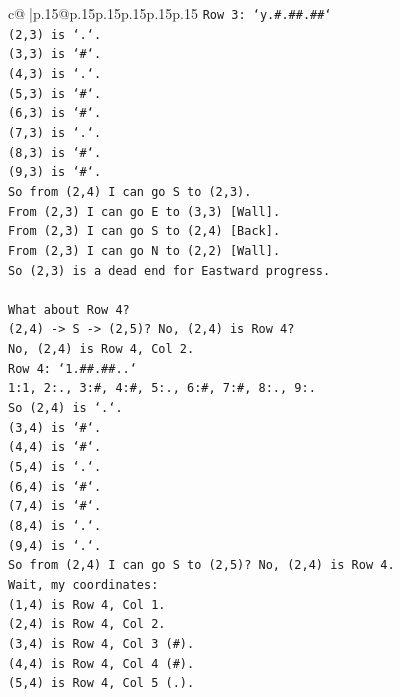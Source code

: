 \documentclass{article}
\begin{document}
{\begin{supertabular}{c@{$\;$}|p{.15\linewidth}@{}p{.15\linewidth}p{.15\linewidth}p{.15\linewidth}p{.15\linewidth}p{.15\linewidth}}
{{{\texttt{Row 3: `y.\#.\#\#.\#\#`} \\
\texttt{(2,3) is `.`.} \\
\texttt{(3,3) is `\#`.} \\
\texttt{(4,3) is `.`.} \\
\texttt{(5,3) is `\#`.} \\
\texttt{(6,3) is `\#`.} \\
\texttt{(7,3) is `.`.} \\
\texttt{(8,3) is `\#`.} \\
\texttt{(9,3) is `\#`.} \\
\texttt{So from (2,4) I can go S to (2,3).} \\
\texttt{From (2,3) I can go E to (3,3) {[}Wall{]}.} \\
\texttt{From (2,3) I can go S to (2,4) {[}Back{]}.} \\
\texttt{From (2,3) I can go N to (2,2) {[}Wall{]}.} \\
\texttt{So (2,3) is a dead end for Eastward progress.} \\
\\ 
\texttt{What about Row 4?} \\
\texttt{(2,4) {-}> S {-}> (2,5)? No, (2,4) is Row 4?} \\
\texttt{No, (2,4) is Row 4, Col 2.} \\
\texttt{Row 4: `1.\#\#.\#\#..`} \\
\texttt{1:1, 2:., 3:\#, 4:\#, 5:., 6:\#, 7:\#, 8:., 9:.} \\
\texttt{So (2,4) is `.`.} \\
\texttt{(3,4) is `\#`.} \\
\texttt{(4,4) is `\#`.} \\
\texttt{(5,4) is `.`.} \\
\texttt{(6,4) is `\#`.} \\
\texttt{(7,4) is `\#`.} \\
\texttt{(8,4) is `.`.} \\
\texttt{(9,4) is `.`.} \\
\texttt{So from (2,4) I can go S to (2,5)? No, (2,4) is Row 4.} \\
\texttt{Wait, my coordinates:} \\
\texttt{(1,4) is Row 4, Col 1.} \\
\texttt{(2,4) is Row 4, Col 2.} \\
\texttt{(3,4) is Row 4, Col 3 (\#).} \\
\texttt{(4,4) is Row 4, Col 4 (\#).} \\
\texttt{(5,4) is Row 4, Col 5 (.).} \\
}}}
\end{supertabular}}
\end{document}
